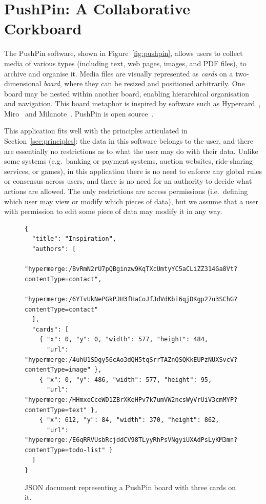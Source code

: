 \documentclass[sigplan,10pt]{acmart}
\begin{document}
\section{PushPin: A Collaborative Corkboard}\label{sec:pushpin}

The PushPin software, shown in Figure~\ref{fig:pushpin}, allows users to collect media of various types (including text, web pages, images, and PDF files), to archive and organise it.
Media files are visually represented as \emph{cards} on a two-dimensional \emph{board}, where they can be resized and positioned arbitrarily.
One board may be nested within another board, enabling hierarchical organisation and navigation.
This board metaphor is inspired by software such as Hypercard~\cite{HyperCard}, Miro~\cite{Miro} and Milanote~\cite{Milanote}.
PushPin is open source~\cite{PushPinSource}.

This application fits well with the principles articulated in Section~\ref{sec:principles}: the data in this software belongs to the user, and there are essentially no restrictions as to what the user may do with their data.
Unlike some systems (e.g.\ banking or payment systems, auction websites, ride-sharing services, or games), in this application there is no need to enforce any global rules or consensus across users, and there is no need for an authority to decide what actions are allowed.
The only restrictions are access permissions (i.e.\ defining which user may view or modify which pieces of data), but we assume that a user with permission to edit some piece of data may modify it in any way.

\begin{figure}
\begin{verbatim}
{
  "title": "Inspiration",
  "authors": [
    "hypermerge:/BvRmN2rU7pQBginzw9KqTXcUmtyYC5aCLiZZ314Ga8Vt?contentType=contact",
    "hypermerge:/6YTvUkNePGkPJH3fHaCoJfJdVdKbi6qjDKgp27u3SChG?contentType=contact"
  ],
  "cards": [
    { "x": 0, "y": 0, "width": 577, "height": 484,
      "url": "hypermerge:/4uhU1SDgy56cAo3dQH5tqSrrTAZnQSQKkEUPzNUXSvcV?contentType=image" },
    { "x": 0, "y": 486, "width": 577, "height": 95,
      "url": "hypermerge:/HHmxeCceWD1ZBrXKeHPv7k7umVW2ncsWyVrUiV3cmMYP?contentType=text" },
    { "x": 612, "y": 84, "width": 370, "height": 862,
      "url": "hypermerge:/E6qRRVUsbRcjddCV98TLyyRhPsVNgyiUXAdPsLyKM3mn?contentType=todo-list" }
  ]
}
\end{verbatim}
\caption{JSON document representing a PushPin board with three cards on it.}
\label{fig:board-json}
\end{figure}
\end{document}
